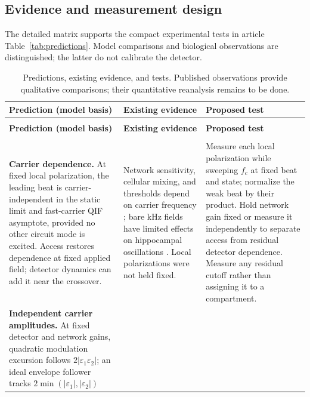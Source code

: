 \subsection{Evidence and measurement design}\label{supp:prediction-evidence}
The detailed matrix supports the compact experimental tests in article
Table~\ref{tab:predictions}. Model comparisons and biological observations
are distinguished; the latter do not calibrate the detector.
\begingroup\small
\renewcommand{\arraystretch}{1.15}
\begin{longtable}{@{}>{\raggedright\arraybackslash}p{}
 >{\raggedright\arraybackslash}p{}
 >{\raggedright\arraybackslash}p{}@{}}
\caption{Predictions, existing evidence, and tests. Published observations provide
qualitative comparisons; their quantitative reanalysis remains to be done.}
\label{tab:prediction-evidence}\\
\toprule
\textbf{Prediction (model basis)} & \textbf{Existing evidence} & \textbf{Proposed test} \\
\midrule\endfirsthead
\multicolumn{3}{@{}l}{\textit{Table \thetable\ continued}}\\
\toprule
\textbf{Prediction (model basis)} & \textbf{Existing evidence} & \textbf{Proposed test} \\
\midrule\endhead
\midrule\multicolumn{3}{r@{}}{\textit{Continued on next page}}\\\endfoot
\bottomrule\endlastfoot
\textbf{Carrier dependence.} At fixed local polarization, the leading beat is
carrier-independent in the static limit and fast-carrier QIF asymptote, provided
no other circuit mode is excited. Access restores dependence at fixed applied
field; detector dynamics can add it near the crossover.
& Network sensitivity, cellular mixing, and thresholds depend on carrier frequency
\cite{esmaeilpour2021,luff2024mixer,opancar2025,peripheral2023}; bare kHz fields
have limited effects on hippocampal oscillations \cite{esmaeilpour2020}.
Local polarizations were not held fixed.
& Measure each local polarization while sweeping $f_c$ at fixed beat and state;
normalize the weak beat by their product. Hold network gain fixed or measure it
independently to separate access from residual detector dependence. Measure any
residual cutoff rather than assigning it to a compartment. \\[4pt]
\textbf{Independent carrier amplitudes.} At fixed detector and network gains,
quadratic modulation excursion follows $2|\varepsilon_1\varepsilon_2|$;
an ideal envelope follower tracks $2\min(|\varepsilon_1|,|\varepsilon_2|)$

\end{longtable}
